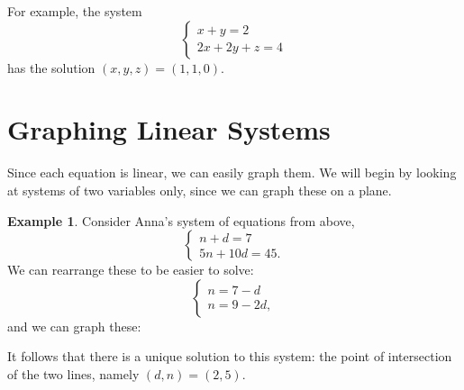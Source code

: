 \documentclass[a4paper,leqno]{article}
\numberwithin{equation}{section}
\theoremstyle{definition}
\newtheorem{ex}[equation]{Example}
\theoremstyle{remark}
\begin{document}
For example, the system
\begin{equation}
  \begin{cases}
    x + y = 2\\
    2x + 2y + z = 4
  \end{cases}
\end{equation}
has the solution $ (x,y,z) = (1,1,0) $.

\section{Graphing Linear Systems}
Since each equation is linear, we can easily graph them. We will begin by looking at systems of two variables only, since we can graph
these on a plane.

\begin{ex}
  Consider Anna's system of equations from above,
  \begin{equation}
    \begin{cases}
      n + d = 7\\
      5n + 10d = 45.
    \end{cases}
  \end{equation}
  We can rearrange these to be easier to solve:
  \begin{equation}
    \begin{cases}
      n = 7 - d\\
      n = 9 - 2d,
    \end{cases}
  \end{equation}
  and we can graph these:
  \begin{center}
  \end{center}
  It follows that there is a unique solution to this system: the point of intersection of the two lines, namely $ (d,n) = (2,5) $.
\end{ex}
\end{document}
